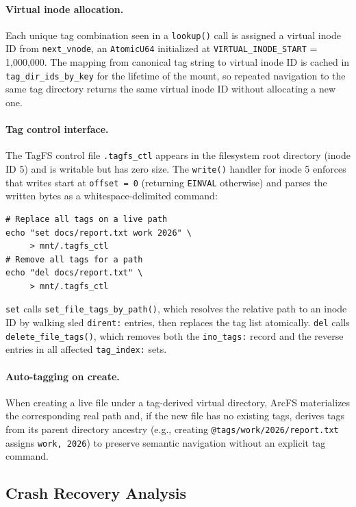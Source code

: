 \documentclass[5p,times]{elsarticle}
\begin{document}
\paragraph{Virtual inode allocation.}
Each unique tag combination seen in a \texttt{lookup()} call is assigned
a virtual inode ID from \texttt{next\_vnode}, an \texttt{AtomicU64}
initialized at \texttt{VIRTUAL\_INODE\_START} = 1,000,000.  The
mapping from canonical tag string to virtual inode ID is cached in
\texttt{tag\_dir\_ids\_by\_key} for the lifetime of the mount, so
repeated navigation to the same tag directory returns the same virtual
inode ID without allocating a new one.

\paragraph{Tag control interface.}
The TagFS control file \texttt{.tagfs\_ctl} appears in the filesystem
root directory (inode ID 5) and is writable but has zero size.  The
\texttt{write()} handler for inode 5 enforces that writes start at
\texttt{offset = 0} (returning \texttt{EINVAL} otherwise) and parses
the written bytes as a whitespace-delimited command:
\begin{lstlisting}
# Replace all tags on a live path
echo "set docs/report.txt work 2026" \
     > mnt/.tagfs_ctl
# Remove all tags for a path
echo "del docs/report.txt" \
     > mnt/.tagfs_ctl
\end{lstlisting}
\texttt{set} calls \texttt{set\_file\_tags\_by\_path()}, which resolves
the relative path to an inode ID by walking sled \texttt{dirent:}
entries, then replaces the tag list atomically.  \texttt{del} calls
\texttt{delete\_file\_tags()}, which removes both the
\texttt{ino\_tags:} record and the reverse entries in all affected
\texttt{tag\_index:} sets.

\paragraph{Auto-tagging on create.}
When creating a live file under a tag-derived virtual directory, ArcFS
materializes the corresponding real path and, if the new file has no
existing tags, derives tags from its parent directory ancestry (e.g.,
creating \texttt{@tags/work/2026/report.txt} assigns \texttt{work, 2026})
to preserve semantic navigation without an explicit tag command.

\subsection{Crash Recovery Analysis}
\label{sec:crash}
\end{document}
